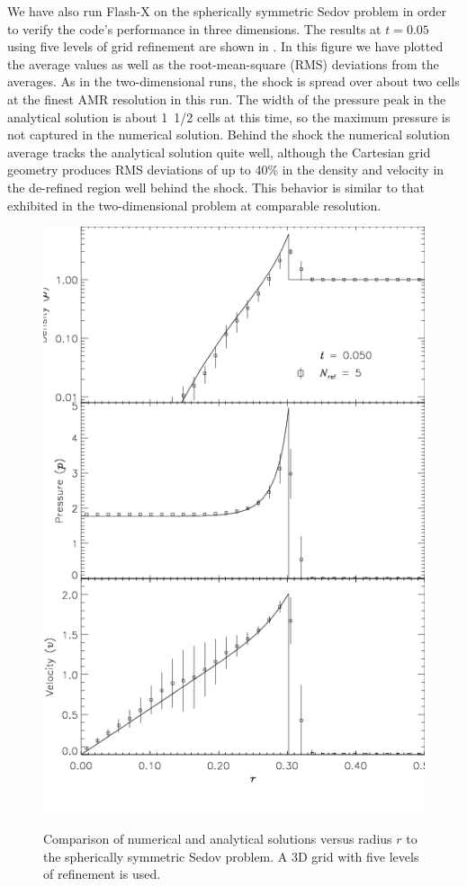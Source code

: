 We have also run Flash-X on the spherically symmetric Sedov problem in
order to verify the code's performance in three dimensions. The
results at $t=0.05$ using five levels of grid refinement are shown
in . In this figure we have plotted the
average values as well as the root-mean-square (RMS) deviations from
the averages. As in the two-dimensional runs, the shock is spread
over about two cells at the finest AMR resolution in this run. The
width of the pressure peak in the analytical solution is about 1~1/2
cells at this time, so the maximum pressure is not captured in the
numerical solution. Behind the shock the numerical solution average
tracks the analytical solution quite well, although the Cartesian
grid geometry produces RMS deviations of up to 40\% in the density
and velocity in the de-refined region well behind the shock. This
behavior is similar to that exhibited in the two-dimensional problem
at comparable resolution.
\begin{figure}
\begin{center}
{\leavevmode\includegraphics[width=5in]{Sedov_3d_single}}
\end{center}
\caption{\label{Fig:Sedov 3D single} Comparison of numerical and analytical
solutions versus radius $r$ to the spherically symmetric Sedov problem. A 3D grid with
five levels of refinement is used.
}
\end{figure}

